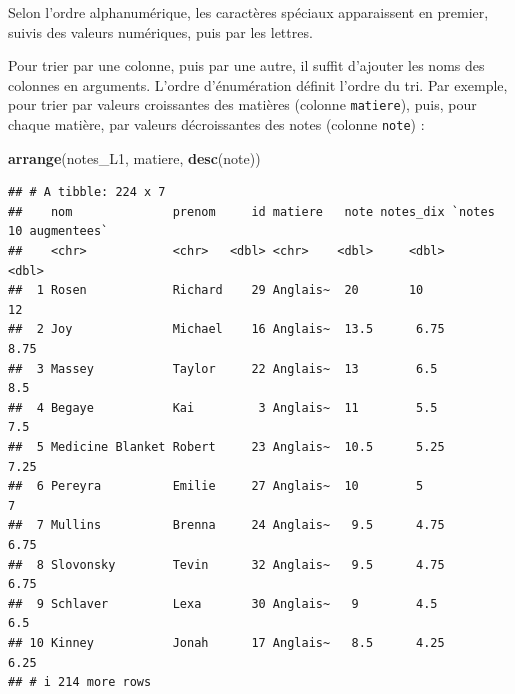 \documentclass[
  11pt,
]{book}
\newenvironment{Shaded}{\begin{snugshade}}{\end{snugshade}}
\newcommand{\FunctionTok}[1]{\textcolor[rgb]{0.13,0.29,0.53}{\textbf{#1}}}
\newcommand{\NormalTok}[1]{#1}
\numberwithin{equation}{section}
\numberwithin{countremarque}{section}
\newenvironment{notebox}{
  \begin{tcolorbox}[breakable, colback=jaune,coltext=black,
                  colframe=grisfonce]}
 {\end{tcolorbox}}
\begin{document}
\begin{notebox}
Selon l'ordre alphanumérique, les caractères spéciaux apparaissent en premier, suivis des valeurs numériques, puis par les lettres.

\end{notebox}

Pour trier par une colonne, puis par une autre, il suffit d'ajouter les noms des colonnes en arguments. L'ordre d'énumération définit l'ordre du tri. Par exemple, pour trier par valeurs croissantes des matières (colonne \texttt{matiere}), puis, pour chaque matière, par valeurs décroissantes des notes (colonne \texttt{note}) :

\begin{Shaded}
\begin{Highlighting}[]
\FunctionTok{arrange}\NormalTok{(notes\_L1, matiere, }\FunctionTok{desc}\NormalTok{(note))}
\end{Highlighting}
\end{Shaded}

\begin{lstlisting}
## # A tibble: 224 x 7
##    nom              prenom     id matiere   note notes_dix `notes 10 augmentees`
##    <chr>            <chr>   <dbl> <chr>    <dbl>     <dbl>                 <dbl>
##  1 Rosen            Richard    29 Anglais~  20       10                    12   
##  2 Joy              Michael    16 Anglais~  13.5      6.75                  8.75
##  3 Massey           Taylor     22 Anglais~  13        6.5                   8.5 
##  4 Begaye           Kai         3 Anglais~  11        5.5                   7.5 
##  5 Medicine Blanket Robert     23 Anglais~  10.5      5.25                  7.25
##  6 Pereyra          Emilie     27 Anglais~  10        5                     7   
##  7 Mullins          Brenna     24 Anglais~   9.5      4.75                  6.75
##  8 Slovonsky        Tevin      32 Anglais~   9.5      4.75                  6.75
##  9 Schlaver         Lexa       30 Anglais~   9        4.5                   6.5 
## 10 Kinney           Jonah      17 Anglais~   8.5      4.25                  6.25
## # i 214 more rows
\end{lstlisting}
\end{document}
